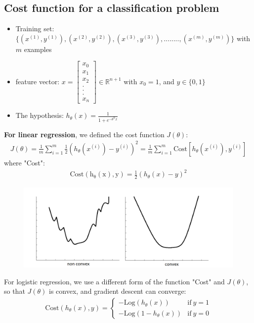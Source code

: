 \documentclass[a4paper,12pt]{report}
\begin{document}
\subsection{Cost function for a classification problem}
\begin{itemize}
\item Training set: $\{(x^{(1)}, y^{(1)}), (x^{(2)}, y^{(2)}), (x^{(3)}, y^{(3)}), ........, (x^{(m)}, y^{(m)}) \}$ with $m$ examples
\item feature vector: $x = \left[ \begin{smallmatrix} x_0\\ x_1\\x_2 \\. \\. \\. \\x_n \end{smallmatrix} \right] \in \mathbb{R}^{n+1}$ with $x_0=1$, and $y \in \{0,1\}$
\item The hypothesis: $h_{\theta}(x) = \frac{1}{1 + e^{-\theta^{\mathrm{T}} x}}$
\end{itemize}
\textbf{For linear regression}, we defined the cost function $J(\theta)$:
\begin{align*}
J(\theta) = \frac{1}{m} \sum_{i=1} ^m \frac{1}{2} \left(h_{\theta}(x^{(i)}) - y^{(i)} \right)^2 =  \frac{1}{m} \sum_{i=1} ^m \mathrm{Cost}\left[h_{\theta}(x^{(i)}), y^{(i)}\right]
\end{align*}
where "Cost":
\begin{align*}
\mathrm{Cost(h_{\theta}(x),y)} = \frac{1}{2} \left(h_{\theta}(x) - y \right)^2
\end{align*}
\begin{figure}[H]
\centering
        \includegraphics[totalheight=5 cm]{convec.png}
\end{figure}

For logistic regression, we use a different form of the function "Cost" and $J(\theta)$, so that $J(\theta)$ is convex, and gradient descent can converge:
\begin{align*}
\mathrm{Cost}(h_{\theta}(x), y)=
\begin{cases}
-\mathrm{Log}(h_{\theta}(x))  & \mathrm{if\ } y=1\\
-\mathrm{Log}(1-h_{\theta}(x)) & \mathrm{if\ } y=0
\end{cases}
\end{align*} 
\end{document}
